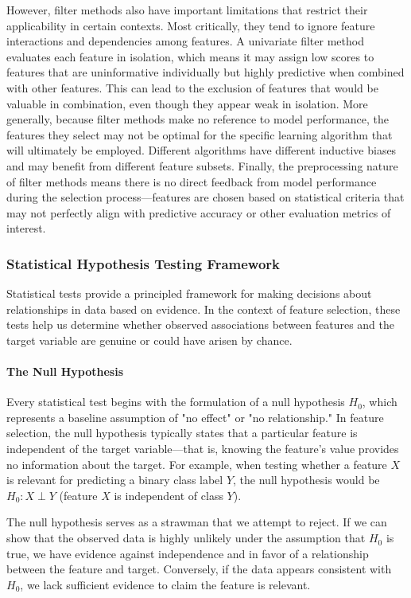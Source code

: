 However, filter methods also have important limitations that restrict their applicability in certain contexts. Most critically, they tend to ignore feature interactions and dependencies among features. A univariate filter method evaluates each feature in isolation, which means it may assign low scores to features that are uninformative individually but highly predictive when combined with other features. This can lead to the exclusion of features that would be valuable in combination, even though they appear weak in isolation. More generally, because filter methods make no reference to model performance, the features they select may not be optimal for the specific learning algorithm that will ultimately be employed. Different algorithms have different inductive biases and may benefit from different feature subsets. Finally, the preprocessing nature of filter methods means there is no direct feedback from model performance during the selection process—features are chosen based on statistical criteria that may not perfectly align with predictive accuracy or other evaluation metrics of interest.

\subsubsection*{Statistical Hypothesis Testing Framework}

Statistical tests provide a principled framework for making decisions about relationships in data based on evidence. In the context of feature selection, these tests help us determine whether observed associations between features and the target variable are genuine or could have arisen by chance.

\paragraph{The Null Hypothesis}

Every statistical test begins with the formulation of a \alert{null hypothesis} $H_0$, which represents a baseline assumption of "no effect" or "no relationship." In feature selection, the null hypothesis typically states that a particular feature is \alert{independent} of the target variable—that is, knowing the feature's value provides no information about the target. For example, when testing whether a feature $X$ is relevant for predicting a binary class label $Y$, the null hypothesis would be $H_0: X \perp Y$ (feature $X$ is independent of class $Y$).

The null hypothesis serves as a strawman that we attempt to reject. If we can show that the observed data is highly unlikely under the assumption that $H_0$ is true, we have evidence against independence and in favor of a relationship between the feature and target. Conversely, if the data appears consistent with $H_0$, we lack sufficient evidence to claim the feature is relevant.

